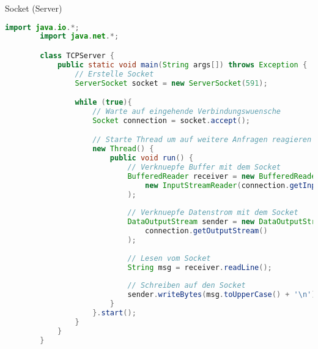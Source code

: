 \begin{example}{Socket (Server)}
    \begin{lstlisting}[language=Java]
        import java.io.*;
        import java.net.*;

        class TCPServer {
            public static void main(String args[]) throws Exception {
                // Erstelle Socket
                ServerSocket socket = new ServerSocket(591);

                while (true){
                    // Warte auf eingehende Verbindungswuensche
                    Socket connection = socket.accept();

                    // Starte Thread um auf weitere Anfragen reagieren zu koennen.
                    new Thread() {
                        public void run() {
                            // Verknuepfe Buffer mit dem Socket
                            BufferedReader receiver = new BufferedReader(
                                new InputStreamReader(connection.getInputStream())
                            );
        
                            // Verknuepfe Datenstrom mit dem Socket
                            DataOutputStream sender = new DataOutputStream(
                                connection.getOutputStream()
                            );
        
                            // Lesen vom Socket
                            String msg = receiver.readLine();
        
                            // Schreiben auf den Socket
                            sender.writeBytes(msg.toUpperCase() + '\n');
                        }
                    }.start();
                }
            }
        }
    \end{lstlisting}
\end{example}